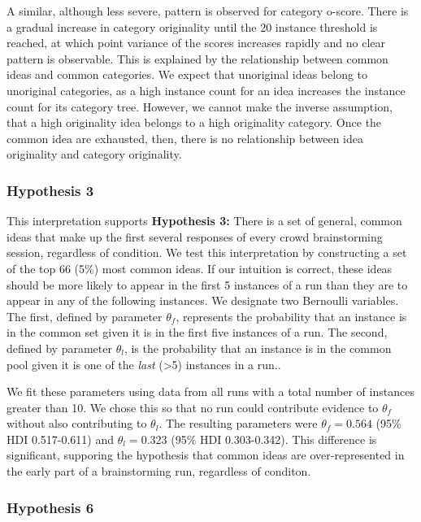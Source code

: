 A similar, although less severe, pattern is observed for category o-score. There is a gradual increase in category originality until the 20 instance threshold is reached, at which point variance of the scores increases rapidly and no clear pattern is observable. This is explained by the relationship between common ideas and common categories. We expect that unoriginal ideas belong to unoriginal categories, as a high instance count for an idea increases the instance count for its category tree. However, we cannot make the inverse assumption, that a high originality idea belongs to a high originality category. Once the common idea are exhausted, then, there is no relationship between idea originality and category originality.

\subsubsection{Hypothesis 3}

This interpretation supports \textbf{Hypothesis 3:} There is a set of general, common ideas that make up the first several responses of every crowd brainstorming session, regardless of condition. We test this interpretation by constructing a set of the top 66 (5\%) most common ideas. If our intuition is correct, these ideas should be more likely to appear in the first 5 instances of a run than they are to appear in any of the following instances. We designate two Bernoulli variables. The first, defined by parameter $\theta_f$, represents the probability that an instance is in the common set given it is in the first five instances of a run. The second, defined by parameter $\theta_l$, is the probability that an instance is in the common pool given it is one of the \emph{last} (>5) instances in a run..

We fit these parameters using data from all runs with a total number of instances greater than 10. We chose this so that no run could contribute evidence to $\theta_f$ without also contributing to $\theta_l$. The resulting parameters were $\theta_f = 0.564$ (95\% HDI 0.517-0.611) and $\theta_l = 0.323$ (95\% HDI 0.303-0.342). This difference is significant, supporing the hypothesis that common ideas are over-represented in the early part of a brainstorming run, regardless of conditon.


\subsubsection{Hypothesis 6}

